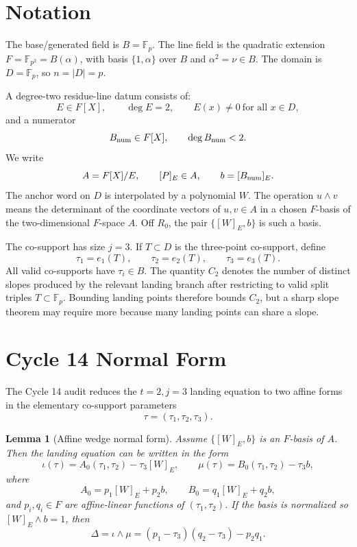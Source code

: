\documentclass[11pt]{article}
\newtheorem{lemma}{Lemma}
\newcommand{\F}{\mathbb F}
\newcommand{\Bnum}{B_{\rm num}}
\newcommand{\tauone}{\tau_1}
\newcommand{\tautwo}{\tau_2}
\newcommand{\tauthree}{\tau_3}
\newcommand{\Ctwo}{C_2}
\begin{document}
\section{Notation}

The base/generated field is \(B=\F_p\).  The line field is the quadratic
extension \(F=\F_{p^2}=B(\alpha)\), with basis \(\{1,\alpha\}\) over \(B\) and
\(\alpha^2=\nu\in B\).  The domain is \(D=\F_p\), so \(n=|D|=p\).

A degree-two residue-line datum consists of:
\[
  E\in F[X],\qquad \deg E=2,\qquad E(x)\ne0\ \text{for all }x\in D,
\]
and a numerator
\[
  \Bnum\in F[X],\qquad \deg \Bnum<2.
\]
We write
\[
  A=F[X]/E,\qquad [P]_E\in A,\qquad b=[\Bnum]_E.
\]
The anchor word on \(D\) is interpolated by a polynomial \(W\).  The operation
\(u\wedge v\) means the determinant of the coordinate vectors of
\(u,v\in A\) in a chosen \(F\)-basis of the two-dimensional \(F\)-space \(A\).
Off \(R_0\), the pair \(\{[W]_E,b\}\) is such a basis.

The co-support has size \(j=3\).  If \(T\subset D\) is the three-point
co-support, define
\[
  \tau_1=e_1(T),\qquad \tau_2=e_2(T),\qquad \tau_3=e_3(T).
\]
All valid co-supports have \(\tau_i\in B\).  The quantity \(\Ctwo\) denotes
the number of distinct slopes produced by the relevant landing branch after
restricting to valid split triples \(T\subset\F_p\).  Bounding landing points
therefore bounds \(\Ctwo\), but a sharp slope theorem may require more because
many landing points can share a slope.

\section{Cycle 14 Normal Form}

The Cycle 14 audit reduces the \(t=2,j=3\) landing equation to two affine
forms in the elementary co-support parameters
\[
  \tau=(\tauone,\tautwo,\tauthree).
\]

\begin{lemma}[Affine wedge normal form]
\label{lem:affine-wedge}
Assume \(\{[W]_E,b\}\) is an \(F\)-basis of \(A\).  Then the landing equation
can be written in the form
\[
  \iota(\tau)=A_0(\tauone,\tautwo)-\tauthree [W]_E,\qquad
  \mu(\tau)=B_0(\tauone,\tautwo)-\tauthree b,
\]
where
\[
  A_0=p_1[W]_E+p_2 b,\qquad B_0=q_1[W]_E+q_2 b,
\]
and \(p_i,q_i\in F\) are affine-linear functions of
\((\tauone,\tautwo)\).  If the basis is normalized so
\([W]_E\wedge b=1\), then
\[
  \Delta=\iota\wedge\mu
    =(p_1-\tauthree)(q_2-\tauthree)-p_2q_1.
\]
\end{lemma}
\end{document}
